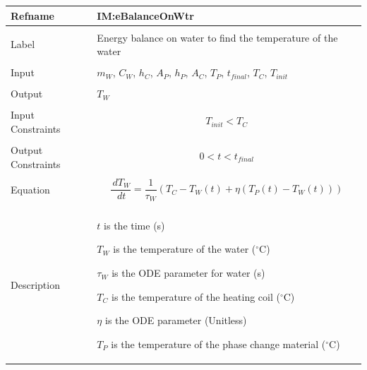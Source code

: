 \documentclass[12pt]{article}
\begin{document}
\noindent \begin{minipage}{\textwidth}
\begin{tabular}{p{} p{}}
\toprule \textbf{Refname} & \textbf{IM:eBalanceOnWtr}
\label{IM:eBalanceOnWtr}
\\ \midrule \\
Label & Energy balance on water to find the temperature of the water
\\ \midrule \\
Input & ${m_{W}}$, ${C_{W}}$, ${h_{C}}$, ${A_{P}}$, ${h_{P}}$, ${A_{C}}$, ${T_{P}}$, ${t_{final}}$, ${T_{C}}$, ${T_{init}}$
\\ \midrule \\
Output & ${T_{W}}$
\\ \midrule \\
Input Constraints & \begin{displaymath}
                    {T_{init}}<{T_{C}}
                    \end{displaymath}
\\ \midrule \\
Output Constraints & \begin{displaymath}
                     0<t<{t_{final}}
                     \end{displaymath}
\\ \midrule \\
Equation & \begin{displaymath}
           \frac{\,d{T_{W}}}{\,dt}=\frac{1}{{τ_{W}}} \left({T_{C}}-{T_{W}}\left(t\right)+η \left({T_{P}}\left(t\right)-{T_{W}}\left(t\right)\right)\right)
           \end{displaymath}
\\ \midrule \\
Description & \begin{symbDescription}
              \item{$t$ is the time (s)}
              \item{${T_{W}}$ is the temperature of the water (${}^{\circ}$C)}
              \item{${τ_{W}}$ is the ODE parameter for water (s)}
              \item{${T_{C}}$ is the temperature of the heating coil (${}^{\circ}$C)}
              \item{$η$ is the ODE parameter (Unitless)}
              \item{${T_{P}}$ is the temperature of the phase change material (${}^{\circ}$C)}
              \end{symbDescription}

\end{tabular}
\end{minipage}
\end{document}
